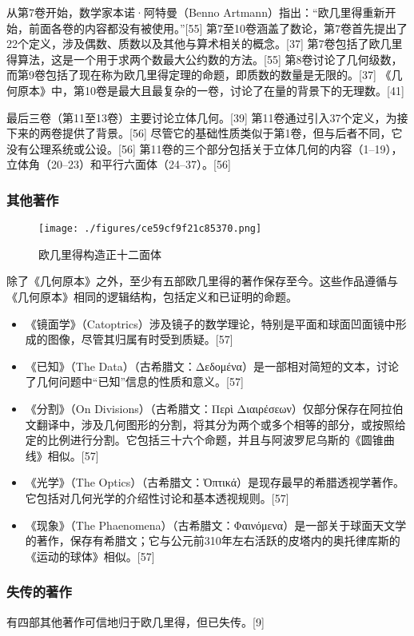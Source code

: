 从第7卷开始，数学家本诺·阿特曼（Benno Artmann）指出：“欧几里得重新开始，前面各卷的内容都没有被使用。”[55] 第7至10卷涵盖了数论，第7卷首先提出了22个定义，涉及偶数、质数以及其他与算术相关的概念。[37] 第7卷包括了欧几里得算法，这是一个用于求两个数最大公约数的方法。[55] 第8卷讨论了几何级数，而第9卷包括了现在称为欧几里得定理的命题，即质数的数量是无限的。[37] 《几何原本》中，第10卷是最大且最复杂的一卷，讨论了在量的背景下的无理数。[41]

最后三卷（第11至13卷）主要讨论立体几何。[39] 第11卷通过引入37个定义，为接下来的两卷提供了背景。[56] 尽管它的基础性质类似于第1卷，但与后者不同，它没有公理系统或公设。[56] 第11卷的三个部分包括关于立体几何的内容（1–19），立体角（20–23）和平行六面体（24–37）。[56]
\subsubsection{其他著作}
\begin{figure}[ht]
\centering
\texttt{[image: ./figures/ce59cf9f21c85370.png]}
\caption{欧几里得构造正十二面体} \label{fig_Euclid_6}
\end{figure}
除了《几何原本》之外，至少有五部欧几里得的著作保存至今。这些作品遵循与《几何原本》相同的逻辑结构，包括定义和已证明的命题。
\begin{itemize}
\item 《镜面学》（Catoptrics）涉及镜子的数学理论，特别是平面和球面凹面镜中形成的图像，尽管其归属有时受到质疑。[57]  
\item 《已知》（The Data）（古希腊文：Δεδομένα）是一部相对简短的文本，讨论了几何问题中“已知”信息的性质和意义。[57]  
\item 《分割》（On Divisions）（古希腊文：Περὶ Διαιρέσεων）仅部分保存在阿拉伯文翻译中，涉及几何图形的分割，将其分为两个或多个相等的部分，或按照给定的比例进行分割。它包括三十六个命题，并且与阿波罗尼乌斯的《圆锥曲线》相似。[57]  
\item 《光学》（The Optics）（古希腊文：Ὀπτικά）是现存最早的希腊透视学著作。它包括对几何光学的介绍性讨论和基本透视规则。[57]  
\item 《现象》（The Phaenomena）（古希腊文：Φαινόμενα）是一部关于球面天文学的著作，保存有希腊文；它与公元前310年左右活跃的皮塔内的奥托律库斯的《运动的球体》相似。[57]
\end{itemize}
\subsubsection{失传的著作}  
有四部其他著作可信地归于欧几里得，但已失传。[9]

